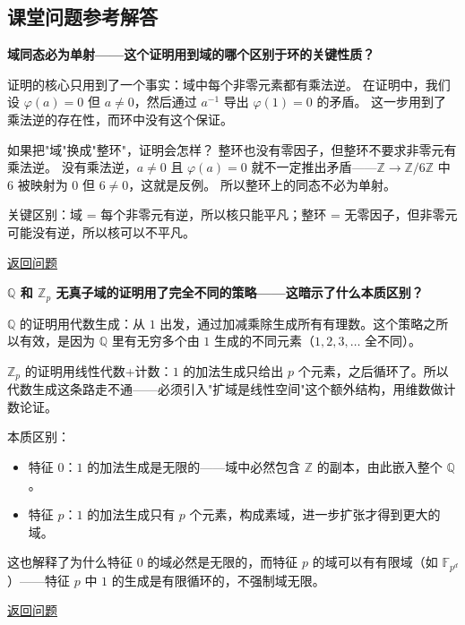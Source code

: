 \subsection*{课堂问题参考解答}

\begin{exercise}\label{ex:ans-field-homomorphism-kernel}
\hypertarget{ans:field-homomorphism-kernel}{}
\textbf{域同态必为单射——这个证明用到域的哪个区别于环的关键性质？}

证明的核心只用到了一个事实：域中每个非零元素都有乘法逆。
在证明中，我们设 $\varphi(a) = 0$ 但 $a \neq 0$，然后通过 $a^{-1}$ 导出 $\varphi(1) = 0$ 的矛盾。
这一步用到了乘法逆的存在性，而环中没有这个保证。

如果把"域"换成"整环"，证明会怎样？
整环也没有零因子，但整环不要求非零元有乘法逆。
没有乘法逆，$a \neq 0$ 且 $\varphi(a) = 0$ 就不一定推出矛盾——$\mathbb{Z} \to \mathbb{Z}/6\mathbb{Z}$ 中 $6$ 被映射为 $0$ 但 $6 \neq 0$，这就是反例。
所以整环上的同态不必为单射。

关键区别：域 = 每个非零元有逆，所以核只能平凡；整环 = 无零因子，但非零元可能没有逆，所以核可以不平凡。

\hyperlink{q:field-homomorphism-kernel}{返回问题}
\end{exercise}

\begin{exercise}\label{ex:ans-q-zp-no-proper-subfield}
\hypertarget{ans:q-zp-no-proper-subfield}{}
\textbf{$\mathbb{Q}$ 和 $\mathbb{Z}_p$ 无真子域的证明用了完全不同的策略——这暗示了什么本质区别？}

$\mathbb{Q}$ 的证明用代数生成：从 $1$ 出发，通过加减乘除生成所有有理数。这个策略之所以有效，是因为 $\mathbb{Q}$ 里有无穷多个由 $1$ 生成的不同元素（$1, 2, 3, \ldots$ 全不同）。

$\mathbb{Z}_p$ 的证明用线性代数+计数：$1$ 的加法生成只给出 $p$ 个元素，之后循环了。所以代数生成这条路走不通——必须引入"扩域是线性空间"这个额外结构，用维数做计数论证。

本质区别：
\begin{itemize}
    \item 特征 $0$：$1$ 的加法生成是无限的——域中必然包含 $\mathbb{Z}$ 的副本，由此嵌入整个 $\mathbb{Q}$。
    \item 特征 $p$：$1$ 的加法生成只有 $p$ 个元素，构成素域，进一步扩张才得到更大的域。
\end{itemize}
这也解释了为什么特征 $0$ 的域必然是无限的，而特征 $p$ 的域可以有有限域（如 $\mathbb{F}_{p^d}$）——特征 $p$ 中 $1$ 的生成是有限循环的，不强制域无限。

\hyperlink{q:q-zp-no-proper-subfield}{返回问题}
\end{exercise}

